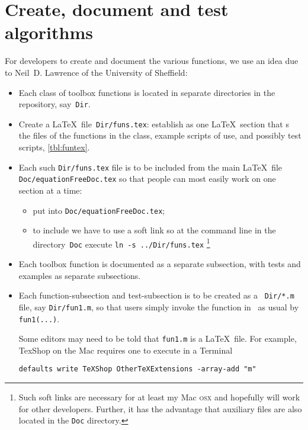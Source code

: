 \section{Create, document and test algorithms}
\label{sec:contribute}
\secttoc

For developers to create and document the various functions, we use an idea due to Neil~D. Lawrence of the University of Sheffield:

\begin{itemize}
\item Each class of toolbox functions is located in separate directories in the repository, say~\verb|Dir|.

\item Create a \LaTeX\ file~\verb|Dir/funs.tex|: establish as one \LaTeX\ section that \verb||s the  files of the functions in the class, example scripts of use, and possibly test scripts, \autoref{tbl:funtex}.

\item Each such \verb|Dir/funs.tex| file is to be included from the main \LaTeX\ file \verb|Doc/equationFreeDoc.tex| so that people can most easily work on one section at a time: 
\begin{itemize}
\item put \verb|| into \verb|Doc/equationFreeDoc.tex|;
\item to include we have to use a soft link so at the command line in the directory~\verb|Doc| execute \verb|ln -s ../Dir/funs.tex|
\footnote{Such soft links are necessary for at least my Mac \textsc{osx} and hopefully will work for other developers.  Further, it has the advantage that auxiliary files are also located in the \texttt{Doc} directory.}
\end{itemize}


\item Each toolbox function is documented as a separate subsection, with tests and examples as separate subsections.

\item Each function-subsection and test-subsection is to be created as a \script\ \verb|Dir/*.m| file, say \verb|Dir/fun1.m|, so that users simply invoke the function in \script\ as usual by \verb|fun1(...)|.

Some editors may need to be told that \verb|fun1.m| is a \LaTeX\ file.  For example, TexShop on the Mac requires one to execute in a Terminal
\begin{verbatim}
defaults write TeXShop OtherTeXExtensions -array-add "m"
\end{verbatim}


\end{itemize}
